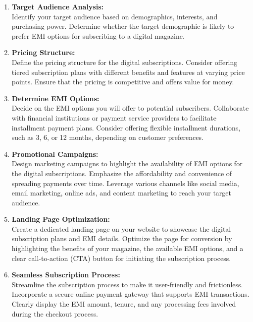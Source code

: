\begin{enumerate}

\item \textbf{Target Audience Analysis:} \\
Identify your target audience based on demographics, interests, and purchasing power. Determine whether the target demographic is likely to prefer EMI options for subscribing to a digital magazine.

\item \textbf{Pricing Structure:} \\
Define the pricing structure for the digital subscriptions. Consider offering tiered subscription plans with different benefits and features at varying price points. Ensure that the pricing is competitive and offers value for money.

\item \textbf{Determine EMI Options:} \\
Decide on the EMI options you will offer to potential subscribers. Collaborate with financial institutions or payment service providers to facilitate installment payment plans. Consider offering flexible installment durations, such as 3, 6, or 12 months, depending on customer preferences.

\item \textbf{Promotional Campaigns:} \\
Design marketing campaigns to highlight the availability of EMI options for the digital subscriptions. Emphasize the affordability and convenience of spreading payments over time. Leverage various channels like social media, email marketing, online ads, and content marketing to reach your target audience.

\item \textbf{Landing Page Optimization:} \\
Create a dedicated landing page on your website to showcase the digital subscription plans and EMI details. Optimize the page for conversion by highlighting the benefits of your magazine, the available EMI options, and a clear call-to-action (CTA) button for initiating the subscription process.

\item \textbf{Seamless Subscription Process:} \\
Streamline the subscription process to make it user-friendly and frictionless. Incorporate a secure online payment gateway that supports EMI transactions. Clearly display the EMI amount, tenure, and any processing fees involved during the checkout process.


\end{enumerate}
